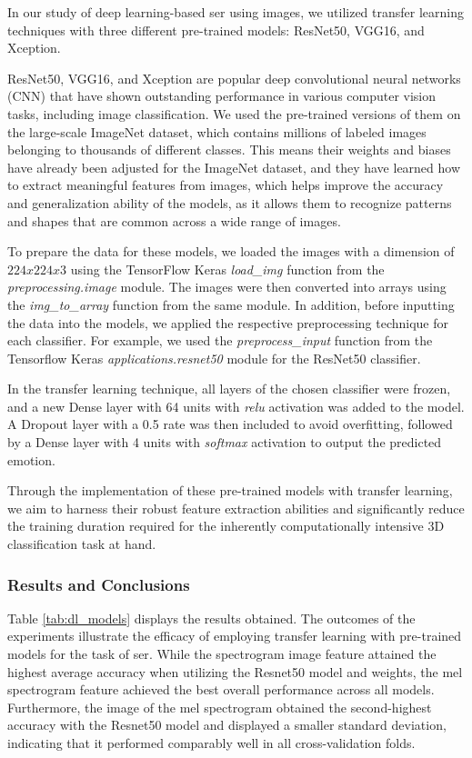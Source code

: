 In our study of deep learning-based \ac{ser} using images, we utilized transfer learning techniques with three different pre-trained models: ResNet50, VGG16, and Xception.

ResNet50, VGG16, and Xception are popular deep convolutional neural networks (CNN) that have shown outstanding performance in various computer vision tasks, including image classification. We used the pre-trained versions of them on the large-scale ImageNet dataset, which contains millions of labeled images belonging to thousands of different classes. This means their weights and biases have already been adjusted for the ImageNet dataset, and they have learned how to extract meaningful features from images, which helps improve the accuracy and generalization ability of the models, as it allows them to recognize patterns and shapes that are common across a wide range of images.

To prepare the data for these models, we loaded the images with a dimension of $224x224x3$ using the TensorFlow Keras \textit{load\_img} function from the \textit{preprocessing.image} module. The images were then converted into arrays using the \textit{img\_to\_array} function from the same module. In addition, before inputting the data into the models, we applied the respective preprocessing technique for each classifier. For example, we used the \textit{preprocess\_input} function from the Tensorflow  Keras \textit{applications.resnet50} module for the ResNet50 classifier.

In the transfer learning technique, all layers of the chosen classifier were frozen, and a new Dense layer with 64 units with \textit{relu} activation was added to the model. A Dropout layer with a 0.5 rate was then included to avoid overfitting, followed by a Dense layer with 4 units with \textit{softmax} activation to output the predicted emotion.

Through the implementation of these pre-trained models with transfer learning, we aim to harness their robust feature extraction abilities and significantly reduce the training duration required for the inherently computationally intensive 3D classification task at hand.


\subsubsection{Results and Conclusions}

Table \ref{tab:dl_models} displays the results obtained. The outcomes of the experiments illustrate the efficacy of employing transfer learning with pre-trained models for the task of \ac{ser}. While the spectrogram image feature attained the highest average accuracy when utilizing the Resnet50 model and weights, the mel spectrogram feature achieved the best overall performance across all models. Furthermore, the image of the mel spectrogram obtained the second-highest accuracy with the Resnet50 model and displayed a smaller standard deviation, indicating that it performed comparably well in all cross-validation folds.

